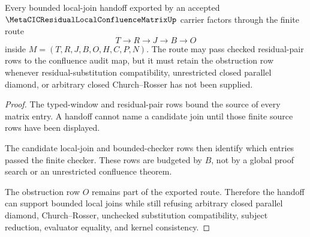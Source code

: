 \begin{theorem}
\label{thm:metacic-residual-local-confluence-matrix-budget-handoff}
Every bounded local-join handoff exported by an accepted $\MetaCICResidualLocalConfluenceMatrixUp$ carrier factors through the finite route
$$
T \longrightarrow R \longrightarrow J \longrightarrow B \longrightarrow O
$$
inside $M=(T,R,J,B,O,H,C,P,N)$. The route may pass checked residual-pair rows to the confluence audit map, but it must retain the obstruction row whenever residual-substitution compatibility, unrestricted closed parallel diamond, or arbitrary closed Church--Rosser has not been supplied.
\end{theorem}
\begin{proof}
The typed-window and residual-pair rows bound the source of every matrix entry. A handoff cannot name a candidate join until those finite source rows have been displayed.

The candidate local-join and bounded-checker rows then identify which entries passed the finite checker. These rows are budgeted by $B$, not by a global proof search or an unrestricted confluence theorem.

The obstruction row $O$ remains part of the exported route. Therefore the handoff can support bounded local joins while still refusing arbitrary closed parallel diamond, Church--Rosser, unchecked substitution compatibility, subject reduction, evaluator equality, and kernel consistency.
\end{proof}




